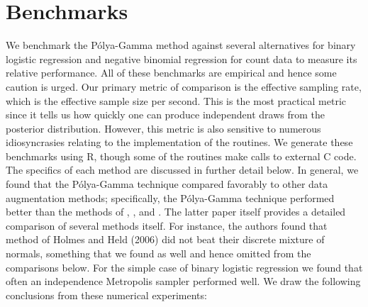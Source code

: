 \documentclass{article}
\newcommand{\Polya}{P\'{o}lya}
\begin{document}
\section{Benchmarks}

We benchmark the \Polya-Gamma method against several alternatives for binary
logistic regression and negative binomial regression for count data to measure
its relative performance.  All of these benchmarks are empirical and hence some
caution is urged.  Our primary metric of comparison is the effective sampling
rate, which is the effective sample size per second.  This is the most practical
metric since it tells us how quickly one can produce independent draws from the
posterior distribution.  However, this metric is also sensitive to numerous
idiosyncrasies relating to the implementation of the routines.  We generate
these benchmarks using R, though some of the routines make calls to external C
code.  The specifics of each method are discussed in further detail below.  In
general, we found that the \Polya-Gamma technique compared favorably to other
data augmentation methods; specifically, the \Polya-Gamma technique performed
better than the methods of \cite{obrien-dunson-2004},
\cite{gramacy-polson-2012}, and \cite{fruhwirth-schnatter-fruhwirth-2010}.  The
latter paper itself provides a detailed comparison of several methods itself.
For instance, the authors found that method of Holmes and Held (2006) did not
beat their discrete mixture of normals, something that we found as well and
hence omitted from the comparisons below.  For the simple case of binary
logistic regression we found that often an independence Metropolis sampler
performed well.  We draw the following conclusions from these numerical
experiments:
\end{document}
